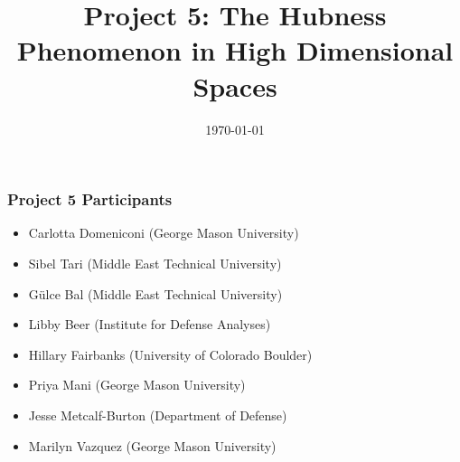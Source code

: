 \documentclass{beamer}
\title[Hubness]{Project 5: The Hubness Phenomenon in High Dimensional Spaces} %
\author{} %
\date{\today} %
\begin{document}
\begin{frame}
\titlepage %
\end{frame}






\begin{frame}
\frametitle{Project 5 Participants}

\begin{itemize}
\item Carlotta Domeniconi (George Mason University)
\item Sibel Tari (Middle East Technical University)
\end{itemize}

\begin{itemize}
\item G\"{u}lce Bal (Middle East Technical University)
\item Libby Beer (Institute for Defense Analyses)
\item Hillary Fairbanks (University of Colorado Boulder)
\item Priya Mani (George Mason University)
\item Jesse Metcalf-Burton (Department of Defense)
\item Marilyn Vazquez (George Mason University)
\end{itemize}
\end{frame}
\end{document}
